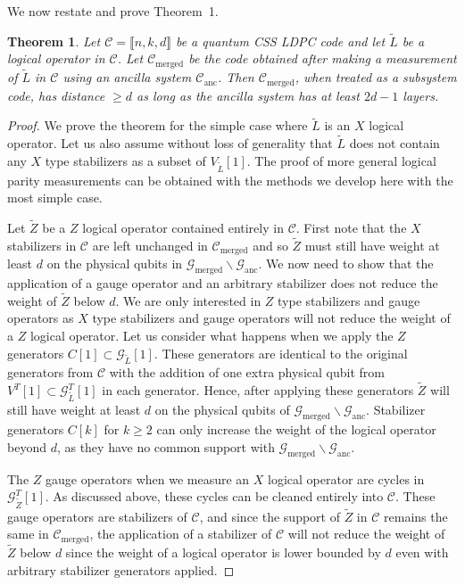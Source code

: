\documentclass[reprint,
superscriptaddress,
 amsmath,amssymb,
 aps, longbibliography
]{revtex4-1}
\newtheorem{theorem2}{Theorem}
\newcommand{\rev}[1]{{#1}}
\begin{document}
We now restate and prove Theorem~1.

\begin{theorem2}
    Let $\mathcal{C} = \llbracket n, k, d \rrbracket$ be a quantum CSS LDPC code and let $\tilde{L}$ be a logical operator in $\mathcal{C}$. Let $\mathcal{C}_{\text{merged}}$ be the code obtained after making a measurement of $\tilde{L}$ in $\mathcal{C}$ using an ancilla system $\mathcal{C}_{\textrm{anc}}$. Then $\mathcal{C}_{\text{merged}}$, when treated as a subsystem code, has distance $\geq d$ as long as the ancilla system has at least $2d-1$ layers.
\end{theorem2}
\begin{proof}

We prove the theorem for the simple case where $\tilde{L}$ is an $X$ logical operator. Let us also assume without loss of generality that $\tilde{L}$ does not contain any $X$ type stabilizers as a subset of $V_{\tilde{L}}[1]$. The proof of more general logical parity measurements can be obtained with the methods we develop here with the most simple case. 

Let $\tilde{Z}$ be a $Z$ logical operator contained entirely in $\mathcal{C}$. First note  that the $X$ stabilizers in $\mathcal{C}$ are left unchanged in $\mathcal{C}_{\textrm{merged}}$ and so $\tilde{Z}$ must still have weight at least $d$ on the physical qubits in $\mathcal{G}_\textrm{merged} \backslash \mathcal{G}_{\textrm{anc}}$. We now need to show that the application of a gauge operator and an arbitrary stabilizer does not reduce the weight of $\tilde{Z}$ below $d$. We are only interested in $Z$ type stabilizers and gauge operators as $X$ type stabilizers and gauge operators will not reduce the weight of a $Z$ logical operator. Let us consider what happens when we apply the $Z$ generators $C[1] \subset \mathcal{G}_{\tilde{L}}[1]$.
These generators are identical to the original generators from $\mathcal{C}$ with the addition of one extra physical qubit from $V^T[1] \subset \mathcal{G}^T_{\tilde{L}}[1]$ in each generator. Hence, after applying these generators \rev{$\tilde{Z}$} will still have weight at least $d$ on the physical qubits of $\mathcal{G}_\textrm{merged} \backslash \mathcal{G}_{\textrm{anc}}$. Stabilizer generators $C[k]$ for $k \ge 2$ can only increase the weight of the logical operator beyond $d$, as they have no common support with $\mathcal{G}_\textrm{merged} \backslash \mathcal{G}_{\textrm{anc}}$.

The $Z$ gauge operators when we measure an $X$ logical operator are cycles in $\mathcal{G}^T_{\tilde{Z}}[1]$. As discussed above, these cycles can be cleaned entirely into $\mathcal{C}$. These gauge operators are stabilizers of $\mathcal{C}$, and since the support of $\tilde{Z}$ in $\mathcal{C}$ remains the same in $\mathcal{C}_{\text{merged}}$, the application of a stabilizer of $\mathcal{C}$ will not reduce the weight of $\tilde{Z}$ below $d$ since the weight of a logical operator is lower bounded by $d$ even with arbitrary stabilizer generators applied.


\end{proof}
\end{document}
